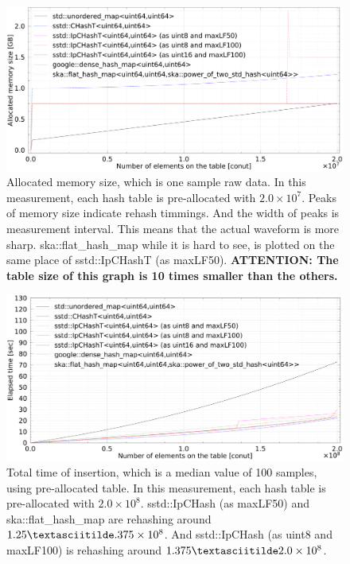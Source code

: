 \begin{figure}[h]
  \hspace{-1mm}
  \includegraphics[scale=0.24]{./fig_bench/usedMemory_preAlloc.pdf}
  \caption{
    Allocated memory size, which is one sample raw data.
    In this measurement, each hash table is pre-allocated with $2.0\times10^7$.
    Peaks of memory size indicate rehash timmings.
    And the width of peaks is measurement interval.
    This means that the actual waveform is more sharp.
    ska::flat\_hash\_map while it is hard to see, is plotted on the same place of sstd::IpCHashT (as maxLF50).
    {\bf ATTENTION: The table size of this graph is 10 times smaller than the others.}
  }
  \label{fig_bench_memory_preAlloc}
\end{figure}


\begin{figure}[h]
  \includegraphics[scale=0.24]{./fig_bench/insert_et_preAlloc_med.pdf}
  \caption{
    Total time of insertion, which is a median value of 100 samples, using pre-allocated table.
    In this measurement, each hash table is pre-allocated with $2.0\times10^8$.
    sstd::IpCHash (as maxLF50) and ska::flat\_hash\_map are rehashing around $1.25\textasciitilde.375\times10^8$.
    And sstd::IpCHash (as uint8 and maxLF100) is rehashing around $1.375\textasciitilde2.0\times10^8$.
  }
  \label{fig_bench_insert_preAlloc}
\end{figure}


